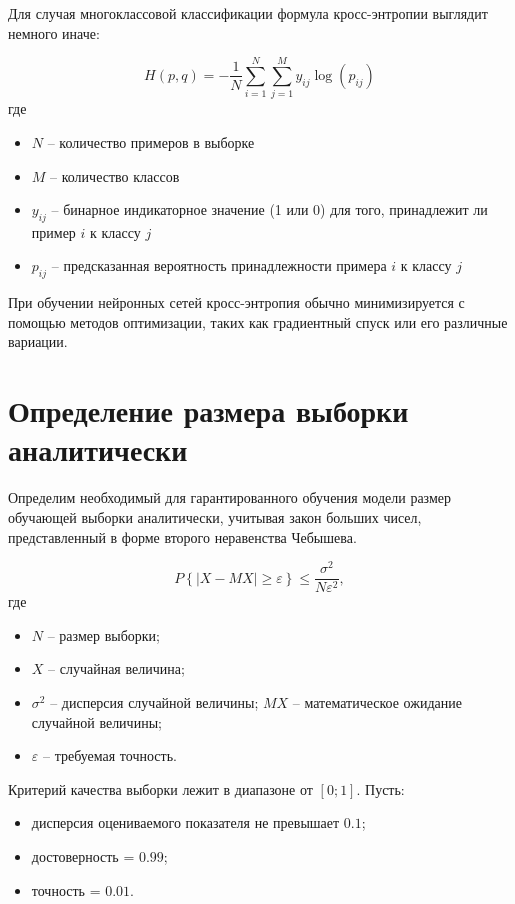 \documentclass[12pt]{report}
\begin{document}
Для случая многоклассовой классификации формула кросс-энтропии выглядит немного иначе:

\[ H(p, q) = -\frac{1}{N} \sum_{i=1}^{N} \sum_{j=1}^{M} y_{ij} \log(p_{ij}) \]
где
\begin{itemize}
    \item \( N \) -- количество примеров в выборке
    \item \( M \) -- количество классов
    \item \( y_{ij} \) -- бинарное индикаторное значение (1 или 0) для того, принадлежит ли пример \( i \) к классу \( j \)
    \item \( p_{ij} \) -- предсказанная вероятность принадлежности примера \( i \) к классу \( j \)
\end{itemize}

При обучении нейронных сетей кросс-энтропия обычно минимизируется с помощью методов оптимизации, таких как градиентный спуск или его различные вариации.


\section{Определение размера выборки аналитически}
Определим необходимый для гарантированного обучения модели размер обучающей выборки аналитически, учитывая закон больших чисел, представленный в форме второго неравенства Чебышева.

\begin{equation}
	\label{hash}
	P\left\{|X - MX| \ge \varepsilon\right\} \le \frac{\sigma^2}{N\varepsilon^2}, 
\end{equation}
где 
\begin{itemize}
    \item $N$ -- размер выборки;
    \item $X$ -- случайная величина;
    \item $\sigma^2$ -- дисперсия случайной величины;
    $MX$ -- математическое ожидание случайной величины;
    \item $\varepsilon$ -- требуемая точность.
\end{itemize}

Критерий качества выборки лежит в диапазоне от $[0;1]$. 
Пусть:
\begin{itemize}
    \item дисперсия оцениваемого показателя не превышает $0.1$;
    \item достоверность = $0.99$;
    \item точность = $0.01$.
\end{itemize}
\end{document}
